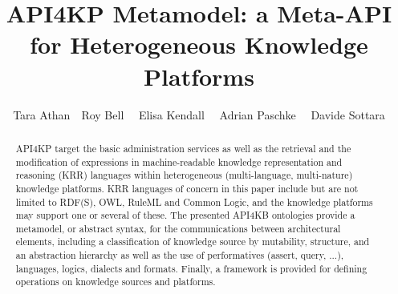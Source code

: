 \documentclass[runningheads]{llncs}
\title{API4KP Metamodel: a Meta-API for Heterogeneous Knowledge Platforms}
\date{}
\begin{document}
%
\author{Tara Athan\ \ Roy Bell \ \ Elisa Kendall \ \ Adrian Paschke \ \ Davide Sottara}

%
\maketitle

\begin{abstract}
API4KP target the basic administration
services as well as the retrieval and the modification of expressions in machine-readable knowledge representation and reasoning (KRR) languages within heterogeneous (multi-language, multi-nature) knowledge platforms.
KRR languages of concern in this paper include but are not limited to RDF(S), OWL, RuleML and Common Logic, and the knowledge platforms may support one or several of these.
The presented API4KB ontologies provide a metamodel, or abstract syntax, for the communications between architectural elements, including a classification of knowledge source by mutability, structure, and an abstraction hierarchy as well as the use of performatives (assert, query, ...), languages, logics, dialects and formats. Finally, a framework is provided for defining operations on knowledge sources and platforms.
\end{abstract}

%

\end{document}
